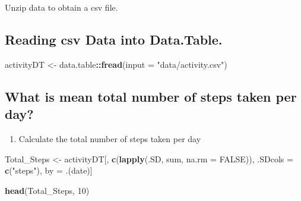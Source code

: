 \documentclass[
]{article}
\newenvironment{Shaded}{\begin{snugshade}}{\end{snugshade}}
\newcommand{\DataTypeTok}[1]{\textcolor[rgb]{0.13,0.29,0.53}{#1}}
\newcommand{\DecValTok}[1]{\textcolor[rgb]{0.00,0.00,0.81}{#1}}
\newcommand{\KeywordTok}[1]{\textcolor[rgb]{0.13,0.29,0.53}{\textbf{#1}}}
\newcommand{\NormalTok}[1]{#1}
\newcommand{\OperatorTok}[1]{\textcolor[rgb]{0.81,0.36,0.00}{\textbf{#1}}}
\newcommand{\OtherTok}[1]{\textcolor[rgb]{0.56,0.35,0.01}{#1}}
\newcommand{\StringTok}[1]{\textcolor[rgb]{0.31,0.60,0.02}{#1}}
\providecommand{\tightlist}{%
  \setlength{\itemsep}{0pt}\setlength{\parskip}{0pt}}
\begin{document}
Unzip data to obtain a csv file.

\begin{Shaded}
\end{Shaded}

\hypertarget{reading-csv-data-into-data.table.}{%
\subsection{Reading csv Data into
Data.Table.}\label{reading-csv-data-into-data.table.}}

\begin{Shaded}
\begin{Highlighting}[]
\NormalTok{activityDT <-}\StringTok{ }\NormalTok{data.table}\OperatorTok{::}\KeywordTok{fread}\NormalTok{(}\DataTypeTok{input =} \StringTok{"data/activity.csv"}\NormalTok{)}
\end{Highlighting}
\end{Shaded}

\hypertarget{what-is-mean-total-number-of-steps-taken-per-day}{%
\subsection{What is mean total number of steps taken per
day?}\label{what-is-mean-total-number-of-steps-taken-per-day}}

\begin{enumerate}
\def\labelenumi{\arabic{enumi}.}
\tightlist
\item
  Calculate the total number of steps taken per day
\end{enumerate}

\begin{Shaded}
\begin{Highlighting}[]
\NormalTok{Total_Steps <-}\StringTok{ }\NormalTok{activityDT[, }\KeywordTok{c}\NormalTok{(}\KeywordTok{lapply}\NormalTok{(.SD, sum, }\DataTypeTok{na.rm =} \OtherTok{FALSE}\NormalTok{)), .SDcols =}\StringTok{ }\KeywordTok{c}\NormalTok{(}\StringTok{"steps"}\NormalTok{), by =}\StringTok{ }\NormalTok{.(date)] }

\KeywordTok{head}\NormalTok{(Total_Steps, }\DecValTok{10}\NormalTok{)}
\end{Highlighting}
\end{Shaded}
\end{document}
